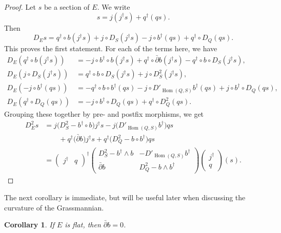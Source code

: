 \documentclass[10pt,a4paper]{article}
\newtheorem{coro}[theo]{Corollary}
\newtheorem*{proof}{Proof}
\DeclareMathOperator{\Hom}{Hom}
\begin{document}
\begin{proof}
Let $s$ be a section of $E$. We write
\[
s = j (j^\dagger s) + q^\dagger( qs).
\]
Then
\[
D_E s
= q^\dagger \circ b (j^\dagger s)
+ j \circ D_S( j^\dagger s)
- j \circ b^\dagger (qs)
+ q^\dagger \circ D_Q (qs).
\]
This proves the first statement.
For each of the terms here, we have
\begin{align*}
D_E(q^\dagger \circ b (j^\dagger s))
&= -j \circ b^\dagger \circ b (j^\dagger s)
+ q^\dagger \circ \bar\partial b (j^\dagger s)
- q^\dagger \circ b \circ D_S(j^\dagger s),
\\
D_E(j \circ D_S( j^\dagger s))
&= q^\dagger \circ b \circ D_S(j^\dagger s)
+ j \circ D_S^2 (j^\dagger s),
\\
D_E(-j \circ b^\dagger (qs))
&= - q^\dagger \circ b \circ b^\dagger (qs)
- j \circ D'_{\Hom(Q,S)}b^\dagger (qs)
+ j \circ b^\dagger \circ D_Q(qs),
\\
D_E(q^\dagger \circ D_Q (qs))
&= -j \circ b^\dagger \circ D_Q(qs)
+ q^\dagger \circ D_Q^2 (qs).
\end{align*}
Grouping these together by pre- and postfix morphisms, we get
\begin{align*}
D_E^2 s
&= j \bigl( D_S^2 - b^\dagger \circ b \bigr) j^\dagger s
- j \bigl( D'_{\Hom(Q,S)} b^\dagger \bigr) qs
\\
&\qquad
+ q^\dagger \bigl( \bar\partial b \bigr) j^\dagger s
+ q^\dagger \bigl( D^2_Q - b \circ b^\dagger \bigr) qs
\\
&=
\begin{pmatrix}
j^\dagger & q
\end{pmatrix}^\dagger
\begin{pmatrix}
D^2_S - b^\dagger \wedge b & -D'_{\Hom(Q,S)} b^\dagger
\\
\bar\partial b & D^2_Q - b \wedge b^\dagger
\end{pmatrix}
\begin{pmatrix}
  j^\dagger \\ q
\end{pmatrix}(s).
\end{align*}
\end{proof}



The next corollary is immediate, but will be useful later when discussing the curvature of the Grassmannian.

\begin{coro}
If $E$ is flat, then $\bar\partial b = 0$.
\end{coro}
\end{document}
